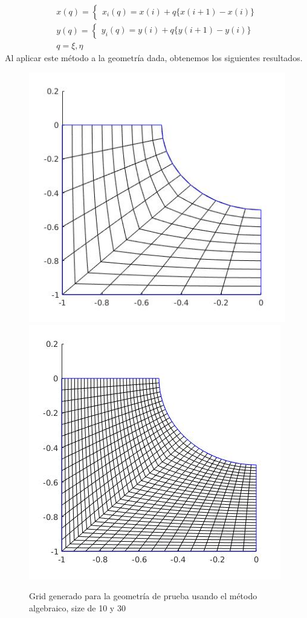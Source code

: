 \documentclass[11pt,letterpaper]{article}
\begin{document}
		\begin{gather*}
			x(q) = 
			\begin{cases}
				x_{i}(q) = x(i) + q \lbrace x(i + 1) - x(i) \rbrace
			\end{cases}
			\\
			y(q) = 
			\begin{cases}
				y_{i}(q) = y(i) + q \lbrace y(i + 1) - y(i) \rbrace
			\end{cases}
			\\
			q = {\xi, \eta}
		\end{gather*}
		Al aplicar este m\'etodo a la geometr\'ia dada, obtenemos los siguientes resultados.
		\begin{figure}[H]
			\centering
			\includegraphics[scale=0.41]{./imgs/img_alg_generator_size_10.jpg}
			\includegraphics[scale=0.41]{./imgs/img_alg_generator_size_30.jpg}
			\caption{Grid generado para la geometr\'ia de prueba usando el m\'etodo algebraico, size de 10 y 30}
			\label{fig:img_grid_algebraic}
		\end{figure}
\end{document}
